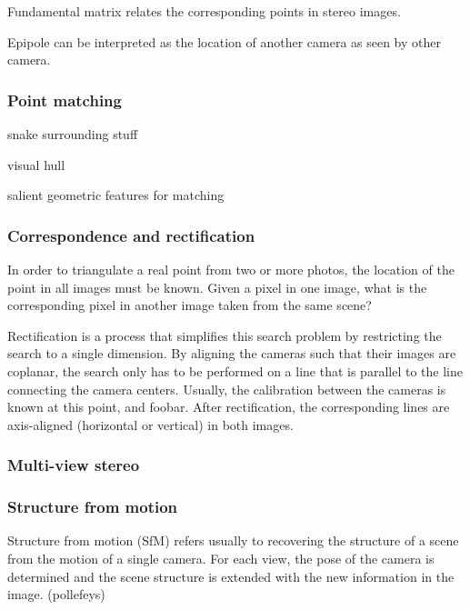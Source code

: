 Fundamental matrix relates the corresponding points in stereo images.

Epipole can be interpreted as the location of another camera as seen by other camera.



\subsubsection{Point matching}


snake surrounding stuff

visual hull

salient geometric features for matching

\subsubsection{Correspondence and rectification}

In order to triangulate a real point from two or more photos, the location of the point in all images must be known.
Given a pixel in one image, what is the corresponding pixel in another image taken from the same scene?

Rectification is a process that simplifies this search problem by restricting the search to a single dimension.
By aligning the cameras such that their images are coplanar, the search only has to be performed on a line that is parallel to the line connecting the camera centers.
Usually, the calibration between the cameras is known at this point, and foobar.
After rectification, the corresponding lines are axis-aligned (horizontal or vertical) in both images.



\subsubsection{Multi-view stereo}

\subsubsection{Structure from motion}

Structure from motion (SfM) refers usually to recovering the structure of a scene from the motion of a single camera.
For each view, the pose of the camera is determined and the scene structure is extended with the new information in the image.
(pollefeys)

